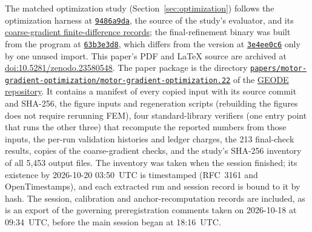 \documentclass{anvil-paper}
\begin{document}
\begin{sloppypar}
The matched optimization study (Section~\ref{sec:optimization}) follows the
optimization harness at
\href{https://github.com/rjwalters/geode-fem/tree/9486a9da58beeca91968d4d3608f06b998abff45/benchmarks/motor_optimization}{\texttt{9486a9da}},
the source of the study's evaluator, and its
\href{https://github.com/rjwalters/geode-fem/tree/9486a9da58beeca91968d4d3608f06b998abff45/benchmarks/motor_optimization/runs}{coarse-gradient finite-difference records};
the final-refinement binary was built from the program at
\href{https://github.com/rjwalters/geode-fem/blob/63b3e3d8bbc30504f845eebb5b78e8be6a2ee12f/crates/geode-core/examples/icem_final_refinement.rs}{\texttt{63b3e3d8}},
which differs from the version at
\href{https://github.com/rjwalters/geode-fem/blob/3e4ee0c63a86dbf014a76c9faf04dd962da16911/crates/geode-core/examples/icem_final_refinement.rs}{\texttt{3e4ee0c6}}
only by one unused import.
This paper's PDF and \LaTeX{} source are archived at
\href{https://doi.org/10.5281/zenodo.23580548}{doi:10.5281/zenodo.23580548}.
The paper package is the directory
\href{https://github.com/rjwalters/geode-fem/tree/main/papers/motor-gradient-optimization/motor-gradient-optimization.22}{\texttt{papers/}\allowbreak\texttt{motor-gradient-optimization/}\allowbreak\texttt{motor-gradient-optimization.22}}
of the \href{https://github.com/rjwalters/geode-fem}{GEODE repository}. It
contains a manifest of every copied input with its source commit and
SHA-256, the figure inputs and regeneration scripts (rebuilding the figures
does not require rerunning FEM), four standard-library verifiers (one
entry point that runs the other three) that recompute the reported numbers
from those inputs, the per-run validation
histories and ledger charges, the 213 final-check results, copies of the
coarse-gradient checks, and the study's SHA-256 inventory of all 5,453
output files. The inventory was taken when the session finished; its
existence by 2026-10-20 03:50~UTC is timestamped (RFC~3161 and
OpenTimestamps), and each extracted run and session record is bound to it
by hash. The session, calibration and anchor-recomputation records are
included, as is an export of the governing preregistration comments taken
on 2026-10-18 at 09:34~UTC, before the main session began at 18:16~UTC.
\end{sloppypar}
\end{document}
